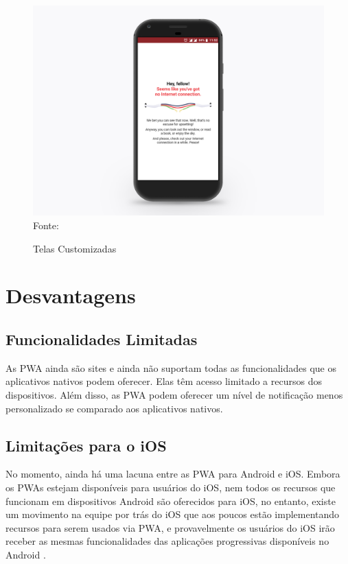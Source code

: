 \begin{figure}[!htpb]
	\centering
	\caption{Telas Customizadas}
	\includegraphics[scale=0.20]{images/pwa_custom.png}\\
	{\footnotesize Fonte:\cite{pwabenefits}}
 	\label{f_c4_pwa_scren}
\end{figure}

\section{Desvantagens}
\subsection{Funcionalidades Limitadas}
As \ac{PWA} ainda são sites e ainda não suportam todas as funcionalidades que os aplicativos nativos podem oferecer. Elas têm acesso limitado a recursos dos dispositivos. Além disso, as \ac{PWA} podem oferecer um nível de notificação menos personalizado se comparado aos aplicativos nativos.

\subsection{Limitações para o iOS}
No momento, ainda há uma lacuna entre as \ac{PWA} para Android e iOS. Embora os PWAs estejam disponíveis para usuários do iOS, nem todos os recursos que funcionam em dispositivos Android são oferecidos para iOS, no entanto, existe um movimento na equipe por trás do iOS que aos poucos estão implementando recursos para serem usados via \ac{PWA}, e provavelmente os usuários do iOS irão receber as mesmas funcionalidades das aplicações progressivas disponíveis no Android \cite{pwaios}.